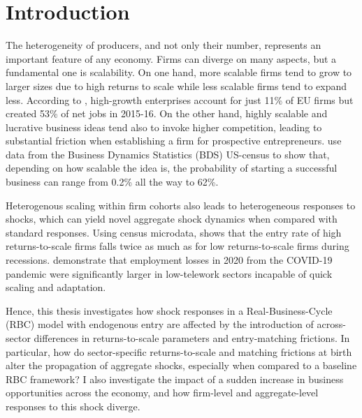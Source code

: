 \documentclass[a4paper,12pt]{article} %
\numberwithin{equation}{section} %
\numberwithin{figure}{section}
\numberwithin{table}{section}
\begin{document}
\newpage
{} %
\pagestyle{fancy}
\fancyhf{}
\fancyhead[C]{\leftmark}
\fancyfoot[C]{\thepage}

\thispagestyle{plain}
\section{Introduction}
\label{sec:introduction}

The heterogeneity of producers, and not only their number, represents an important feature of any economy. Firms can diverge on many aspects,
but a fundamental one is scalability. On one hand, more scalable firms tend to grow to larger sizes due to high returns to scale while less scalable firms tend
to expand less. According to \textcite{flachenecker2020highgrowth}, high-growth enterprises account for just 11\% of EU firms but created 53\% 
of net jobs in 2015-16.
On the other hand, highly scalable and lucrative business ideas tend also to invoke higher competition, leading to
substantial friction when establishing a firm for prospective entrepreneurs. \textcite{sedlavcek2017growth} use data from the 
Business Dynamics Statistics (BDS) US-census to show that, depending on how scalable the idea is, the probability of 
starting a successful business can range from 0.2\% all the way to 62\%.

Heterogenous scaling within firm cohorts also leads to heterogeneous responses to shocks, which can yield novel aggregate shock dynamics when compared
with standard responses. Using census microdata, \textcite{smirnyagin2023returns} shows that the entry rate of high returns-to-scale firms falls 
twice as much as for low returns-to-scale firms during recessions. \textcite{calligaris2023employment} demonstrate that employment losses in 2020 from the COVID-19
pandemic were significantly larger in low-telework sectors incapable of quick scaling and adaptation.

Hence, this thesis investigates how shock responses in a Real-Business-Cycle (RBC) model with endogenous entry are affected by the introduction of across-sector 
differences in returns-to-scale parameters and entry-matching frictions. In particular, how do sector-specific returns-to-scale and matching frictions at birth 
alter the propagation of aggregate shocks, especially when compared to a baseline RBC framework? I also investigate the impact of a sudden increase in business 
opportunities across the economy, and how firm-level and aggregate-level responses to this shock diverge.
\end{document}
